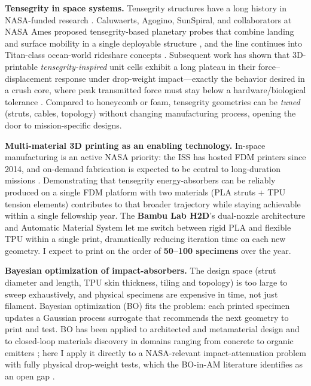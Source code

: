 \documentclass[11pt]{article}
\begin{document}
\textbf{Tensegrity in space systems.} Tensegrity structures have a long
history in NASA-funded research \citep{skelton2009tensegrity,sultan2009tensegrity}.
Caluwaerts, Agogino, SunSpiral, and collaborators at
NASA Ames proposed tensegrity-based planetary probes that combine landing and
surface mobility in a single deployable structure
\citep{caluwaerts2014superball,agogino2018superball,sabelhaus2015system,vespignani2018design},
and the line continues into Titan-class ocean-world rideshare concepts
\citep{deitrich2022titan}.  Subsequent work has shown that 3D-printable
\emph{tensegrity-inspired} unit cells exhibit a long
plateau in their force--displacement response under drop-weight impact---exactly
the behavior desired in a crush core, where peak transmitted force must stay
below a hardware/biological tolerance \citep{pajunen2019design}.  Compared
to honeycomb or foam, tensegrity
geometries can be \emph{tuned} (struts, cables, topology) without changing
manufacturing process, opening the door to mission-specific designs.

\textbf{Multi-material 3D printing as an enabling technology.}  In-space
manufacturing is an active NASA priority: the ISS has hosted FDM printers
since 2014, and on-demand fabrication is expected to be central to long-duration
missions \citep{prater2019summary}.  Demonstrating that tensegrity
energy-absorbers can be reliably produced on a single FDM platform with two
materials (PLA struts + TPU tension elements) contributes to that
broader trajectory while staying achievable within a single fellowship year.
The \textbf{Bambu Lab H2D}'s dual-nozzle architecture and Automatic Material
System let me switch between rigid PLA and flexible TPU within a single
print, dramatically reducing iteration time on each new geometry.  I expect
to print on the order of \textbf{50--100 specimens} over the year.

\textbf{Bayesian optimization of impact-absorbers.}  The design space (strut
diameter and length, TPU skin thickness, tiling and topology) is too large to
sweep exhaustively, and physical specimens are expensive in time, not just
filament.  Bayesian optimization (BO) \citep{shahriari2016taking,frazier2018tutorial,zhang2021bo}
fits the problem: each printed specimen updates a Gaussian process surrogate
that recommends the next geometry to print and test.  BO has been
applied to architected and metamaterial design \citep{mo2023accelerated,zhang2021bo}
and to closed-loop materials discovery in domains ranging from concrete
\citep{ament2023sustainable} to organic emitters
\citep{striethkalthoff2024delocalized}; here I apply it directly to a
NASA-relevant impact-attenuation problem with fully physical drop-weight tests,
which the BO-in-AM literature identifies as an open gap \citep{zhang2021bo}.
\end{document}
